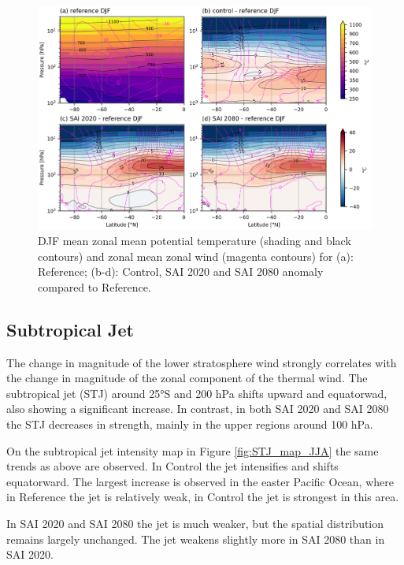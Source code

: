 \begin{figure}[H]
	\centering
	\includegraphics[width=0.95\linewidth]{images/th_U_zmdiff_DJF.png}
	\caption{DJF mean zonal mean potential temperature (shading and black contours) and zonal mean zonal wind (magenta contours) for (a): Reference; (b-d): Control, SAI 2020 and SAI 2080 anomaly compared to Reference.}
	\label{fig:th_U_zmdiff_DJF}
\end{figure}


\subsection{Subtropical Jet}
The change in magnitude of the lower stratosphere wind strongly correlates with the change in magnitude of the zonal component of the thermal wind. The subtropical jet (STJ) around 25°S and 200 hPa shifts upward and equatorwad, also showing a significant increase. In contrast, in both SAI 2020 and SAI 2080 the STJ decreases in strength, mainly in the upper regions around 100 hPa.  

On the subtropical jet intensity map in Figure \ref{fig:STJ_map_JJA} the same trends as above are observed. In Control the jet intensifies and shifts equatorward. The largest increase is observed in the easter Pacific Ocean, where in Reference the jet is relatively weak, in Control the jet is strongest in this area.

In SAI 2020 and SAI 2080 the jet is much weaker, but the spatial distribution remains largely unchanged. The jet weakens slightly more in SAI 2080 than in SAI 2020. 


